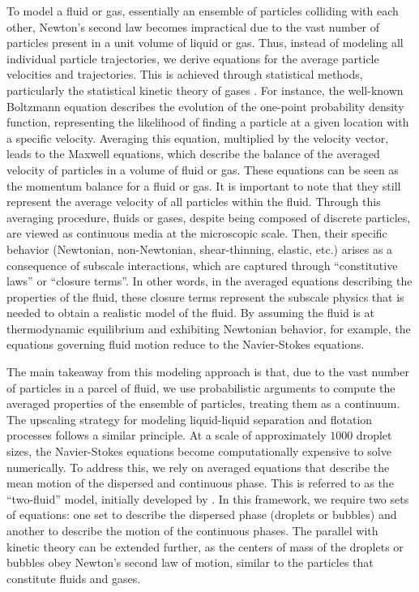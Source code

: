 To model a fluid or gas, essentially an ensemble of particles colliding with each other, Newton's second law becomes impractical due to the vast number of particles present in a unit volume of liquid or gas.
Thus, instead of modeling all individual particle trajectories, we derive equations for the average particle velocities and trajectories.
This is achieved through statistical methods, particularly the statistical kinetic theory of gases \citep{hansen2013theory,kardar2007statistical}.
For instance, the well-known Boltzmann equation describes the evolution of the one-point probability density function, representing the likelihood of finding a particle at a given location with a specific velocity.
Averaging this equation, multiplied by the velocity vector, leads to the Maxwell equations, which describe the balance of the averaged velocity of particles in a volume of fluid or gas.
These equations can be seen as the momentum balance for a fluid or gas.
It is important to note that they still represent the average velocity of all particles within the fluid.
Through this averaging procedure, fluids or gases, despite being composed of discrete particles, are viewed as continuous media at the microscopic scale.
Then, their specific behavior (Newtonian, non-Newtonian, shear-thinning, elastic, etc.) arises as a consequence of subscale interactions, which are captured through ``constitutive laws'' or ``closure terms''.
In other words, in the averaged equations describing the properties of the fluid, these closure terms represent the subscale physics that is needed to obtain a realistic model of the fluid.
By assuming the fluid is at thermodynamic equilibrium and exhibiting Newtonian behavior, for example, the equations governing fluid motion reduce to the Navier-Stokes equations. 

The main takeaway from this modeling approach is that, due to the vast number of particles in a parcel of fluid, we use probabilistic arguments to compute the averaged properties of the ensemble of particles, treating them as a continuum.
The upscaling strategy for modeling liquid-liquid separation and flotation processes follows a similar principle.
At a scale of approximately $1000$ droplet sizes, the Navier-Stokes equations become computationally expensive to solve numerically.
To address this, we rely on averaged equations that describe the mean motion of the dispersed and continuous phase.
This is referred to as the ``two-fluid'' model, initially developed by \citet{drew1983mathematical}.
In this framework, we require two sets of equations: one set to describe the dispersed phase (droplets or bubbles) and another to describe the motion of the continuous phases.
The parallel with kinetic theory can be extended further, as the centers of mass of the droplets or bubbles obey Newton's second law of motion, similar to the particles that constitute fluids and gases.


